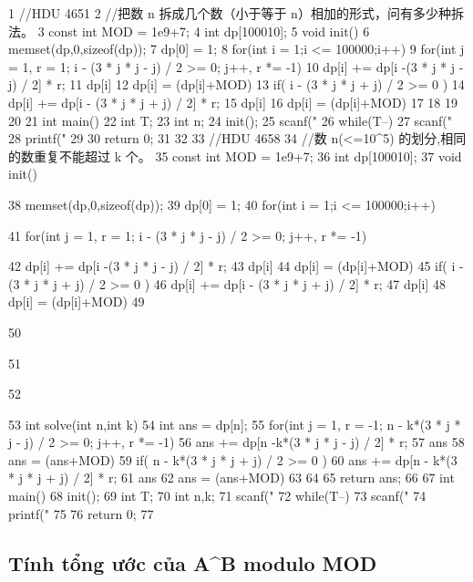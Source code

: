 \documentclass[11pt]{article}
\begin{document}
\begin{Code}
1    //HDU 4651
2    //把数 n 拆成几个数（小于等于 n）相加的形式，问有多少种拆法。
3    const int MOD = 1e9+7;
4    int dp[100010];
5    void init(){
6        memset(dp,0,sizeof(dp));
7        dp[0] = 1;
8        for(int i = 1;i <= 100000;i++){
9            for(int j = 1, r = 1; i - (3 * j * j - j) / 2 >= 0; j++, r
                *= -1){
10               dp[i] += dp[i -(3 * j * j - j) / 2] * r;
11               dp[i] %
12               dp[i] = (dp[i]+MOD)%
13               if( i - (3 * j * j + j) / 2 >= 0 ){
14                   dp[i] += dp[i - (3 * j * j + j) / 2] * r;
15                   dp[i] %
16                   dp[i] = (dp[i]+MOD)%
17               }
18           }
19       }
20   }
21   int main(){
22       int T;
23       int n;
24       init();
25       scanf("%
26       while(T--){
27           scanf("%
28           printf("%
29       }
30       return 0;
31   }
32
33   //HDU 4658
34   //数 n(<=10^5) 的划分,相同的数重复不能超过 k 个。
35   const int MOD = 1e9+7;
36   int dp[100010];
37   void init(){
38       memset(dp,0,sizeof(dp));
39       dp[0] = 1;
40       for(int i = 1;i <= 100000;i++){
41           for(int j = 1, r = 1; i - (3 * j * j - j) / 2 >= 0; j++, r
                *= -1){
42               dp[i] += dp[i -(3 * j * j - j) / 2] * r;
43               dp[i] %
44               dp[i] = (dp[i]+MOD)%
45               if( i - (3 * j * j + j) / 2 >= 0 ){
46                   dp[i] += dp[i - (3 * j * j + j) / 2] * r;
47                   dp[i] %
48                   dp[i] = (dp[i]+MOD)%
49               }


50         }
51     }
52 }
53 int solve(int n,int k){
54     int ans = dp[n];
55     for(int j = 1, r = -1; n - k*(3 * j * j - j) / 2 >= 0; j++, r
          *= -1){
56         ans += dp[n -k*(3 * j * j - j) / 2] * r;
57         ans %
58         ans = (ans+MOD)%
59         if( n - k*(3 * j * j + j) / 2 >= 0 ){
60              ans += dp[n - k*(3 * j * j + j) / 2] * r;
61              ans %
62              ans = (ans+MOD)%
63         }
64     }
65     return ans;
66 }
67 int main(){
68     init();
69     int T;
70     int n,k;
71     scanf("%
72     while(T--){
73         scanf("%
74         printf("%
75     }
76     return 0;
77 }
\end{Code}

\subsection{Tính tổng ước của A\textasciicircum{}B modulo MOD}
\end{document}
